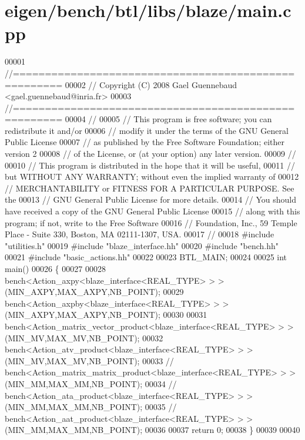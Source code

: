 \hypertarget{eigen_2bench_2btl_2libs_2blaze_2main_8cpp_source}{}\section{eigen/bench/btl/libs/blaze/main.cpp}
\label{eigen_2bench_2btl_2libs_2blaze_2main_8cpp_source}

\begin{DoxyCode}
00001 \textcolor{comment}{//=====================================================}
00002 \textcolor{comment}{// Copyright (C) 2008 Gael Guennebaud <gael.guennebaud@inria.fr>}
00003 \textcolor{comment}{//=====================================================}
00004 \textcolor{comment}{//}
00005 \textcolor{comment}{// This program is free software; you can redistribute it and/or}
00006 \textcolor{comment}{// modify it under the terms of the GNU General Public License}
00007 \textcolor{comment}{// as published by the Free Software Foundation; either version 2}
00008 \textcolor{comment}{// of the License, or (at your option) any later version.}
00009 \textcolor{comment}{//}
00010 \textcolor{comment}{// This program is distributed in the hope that it will be useful,}
00011 \textcolor{comment}{// but WITHOUT ANY WARRANTY; without even the implied warranty of}
00012 \textcolor{comment}{// MERCHANTABILITY or FITNESS FOR A PARTICULAR PURPOSE.  See the}
00013 \textcolor{comment}{// GNU General Public License for more details.}
00014 \textcolor{comment}{// You should have received a copy of the GNU General Public License}
00015 \textcolor{comment}{// along with this program; if not, write to the Free Software}
00016 \textcolor{comment}{// Foundation, Inc., 59 Temple Place - Suite 330, Boston, MA  02111-1307, USA.}
00017 \textcolor{comment}{//}
00018 \textcolor{preprocessor}{#include "utilities.h"}
00019 \textcolor{preprocessor}{#include "blaze\_interface.hh"}
00020 \textcolor{preprocessor}{#include "bench.hh"}
00021 \textcolor{preprocessor}{#include "basic\_actions.hh"}
00022 
00023 BTL\_MAIN;
00024 
00025 \textcolor{keywordtype}{int} main()
00026 \{
00027 
00028   bench<Action\_axpy<blaze\_interface<REAL\_TYPE> > >(MIN\_AXPY,MAX\_AXPY,NB\_POINT);
00029   bench<Action\_axpby<blaze\_interface<REAL\_TYPE> > >(MIN\_AXPY,MAX\_AXPY,NB\_POINT);
00030 
00031   bench<Action\_matrix\_vector\_product<blaze\_interface<REAL\_TYPE> > >(MIN\_MV,MAX\_MV,NB\_POINT);
00032   bench<Action\_atv\_product<blaze\_interface<REAL\_TYPE> > >(MIN\_MV,MAX\_MV,NB\_POINT);
00033 \textcolor{comment}{//   bench<Action\_matrix\_matrix\_product<blaze\_interface<REAL\_TYPE> > >(MIN\_MM,MAX\_MM,NB\_POINT);}
00034 \textcolor{comment}{//   bench<Action\_ata\_product<blaze\_interface<REAL\_TYPE> > >(MIN\_MM,MAX\_MM,NB\_POINT);}
00035 \textcolor{comment}{//   bench<Action\_aat\_product<blaze\_interface<REAL\_TYPE> > >(MIN\_MM,MAX\_MM,NB\_POINT);}
00036 
00037   \textcolor{keywordflow}{return} 0;
00038 \}
00039 
00040 
\end{DoxyCode}
